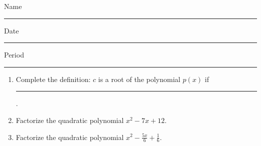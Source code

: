 \documentclass[twoside, 10pt]{article}
\title{}
\date{}
\begin{document}
\noindent
{\large
Name \rule{16em}{.5pt} Date \rule{8em}{.5pt} Period \rule{2em}{.5pt}
}
\vspace{1em}

\begin{enumerate}
    \item Complete the definition: $c$ is a root of the polynomial $p(x)$ if \rule{10em}{0.5pt} .
    \item Factorize the quadratic polynomial \(x^2 -7x +12\).
    \item Factorize the quadratic polynomial \(\displaystyle x^2 - \frac{5x}{6}+\frac{1}{6}\).
\end{enumerate}
\end{document}
